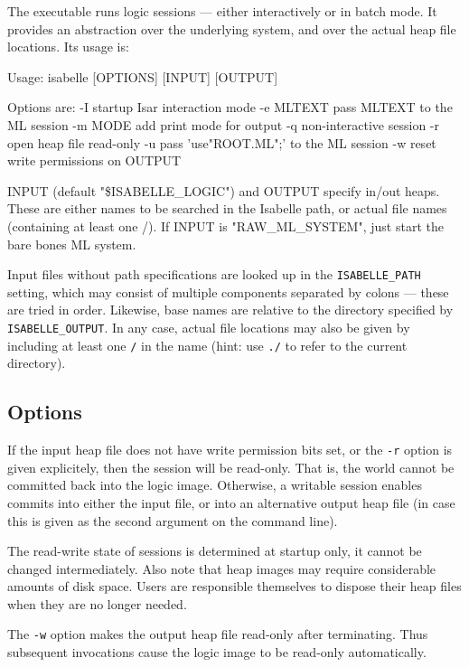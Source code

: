 The  executable runs logic sessions --- either
interactively or in batch mode. It provides an abstraction over the
underlying {\ML} system, and over the actual heap file locations. Its
usage is:
\begin{ttbox}
Usage: isabelle [OPTIONS] [INPUT] [OUTPUT]

  Options are:
    -I           startup Isar interaction mode
    -e MLTEXT    pass MLTEXT to the ML session
    -m MODE      add print mode for output
    -q           non-interactive session
    -r           open heap file read-only
    -u           pass 'use"ROOT.ML";' to the ML session
    -w           reset write permissions on OUTPUT

  INPUT (default "\$ISABELLE_LOGIC") and OUTPUT specify in/out heaps.
  These are either names to be searched in the Isabelle path, or actual
  file names (containing at least one /).
  If INPUT is "RAW_ML_SYSTEM", just start the bare bones ML system.
\end{ttbox}
Input files without path specifications are looked up in the
\texttt{ISABELLE_PATH} setting, which may consist of multiple
components separated by colons --- these are tried in order.
Likewise, base names are relative to the directory specified by
\texttt{ISABELLE_OUTPUT}.  In any case, actual file locations may also
be given by including at least one \texttt{/} in the name (hint: use
\texttt{./} to refer to the current directory).


\subsection*{Options}

If the input heap file does not have write permission bits set, or the
\texttt{-r} option is given explicitely, then the session will be
read-only. That is, the {\ML} world cannot be committed back into the
logic image.  Otherwise, a writable session enables commits into
either the input file, or into an alternative output heap file (in
case this is given as the second argument on the command line).

The read-write state of sessions is determined at startup only, it
cannot be changed intermediately. Also note that heap images may
require considerable amounts of disk space. Users are responsible
themselves to dispose their heap files when they are no longer needed.

\medskip The \texttt{-w} option makes the output heap file read-only
after terminating.  Thus subsequent invocations cause the logic image
to be read-only automatically.

